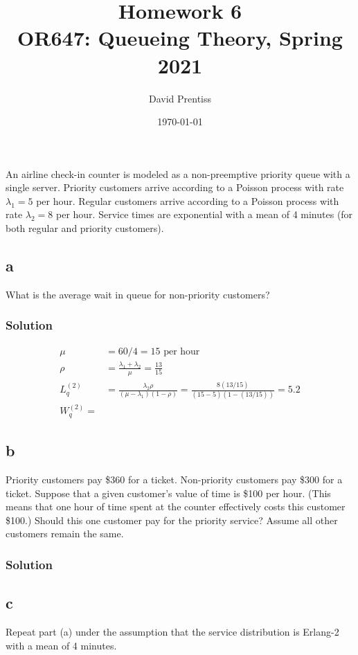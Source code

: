 \documentclass[letterpaper]{amsart}
\title[Homework 6]{Homework 6 \\ OR647: Queueing Theory, Spring 2021}
\author{David Prentiss}
\date{\today}
\begin{document}
\maketitle

\section{} %
An airline check-in counter is modeled as a non-preemptive priority queue with a
single server. Priority customers arrive according to a Poisson process with
rate $\lambda_1=5$ per hour. Regular customers arrive according to a Poisson process
with rate $\lambda_2=8$ per hour. Service times are exponential with a mean of 4
minutes (for both regular and priority customers).

\subsection*{a}
What is the average wait in queue for non-priority customers?
\subsubsection*{Solution}
\begin{align*}
  \mu &= 60/4=15\text{ per hour}\\
  \rho &=  \frac{\lambda_1+\lambda_2}{\mu} = \frac{13}{15}\\
  L_q^{(2)}&=\frac{\lambda_2\rho}{(\mu-\lambda_1)(1-\rho)}=\frac{8(13/15)}{(15-5)(1-(13/15))}
             = 5.2 \\
  W_q^{(2)}=
\end{align*}

\subsection*{b}
Priority customers pay \$360 for a ticket. Non-priority customers pay \$300 for a ticket. Suppose that a given customer’s value of time is \$100 per hour. (This means that one hour of time spent at the counter effectively costs this customer \$100.) Should this one customer pay for the priority service? Assume all other customers remain the same.
\subsubsection*{Solution}

\subsection*{c}
Repeat part (a) under the assumption that the service distribution is
Erlang-2 with a mean of 4 minutes.
\end{document}

